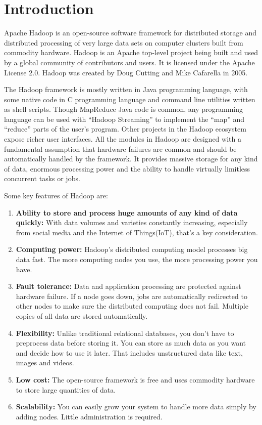 \documentclass[conference]{IEEEtran}
\begin{document}
\section{Introduction}
Apache Hadoop is an open-source software framework for distributed storage
and distributed processing of very large data sets on computer clusters built from commodity
hardware.\cite{Apache} Hadoop is an Apache top-level project being built and used by a global
community of contributors and users. It is licensed under the Apache License 2.0.\cite{Introapache} 
Hadoop was created by Doug Cutting and Mike Cafarella in 2005.
\par The Hadoop framework is mostly written in Java programming language,
with some native code in C programming language and command line utilities
written as shell scripts. Though MapReduce Java code is common, any programming language can
be used with “Hadoop Streaming” to implement the “map” and “reduce” parts of the user’s program.\cite{Hadoopadventures}
Other projects in the Hadoop ecosystem expose richer user interfaces.
All the modules in Hadoop are designed with a fundamental assumption that
hardware failures are common and should be automatically handled by the framework.
It provides massive storage for any kind of data, enormous processing power and the ability to handle virtually
limitless concurrent tasks or jobs.
\par Some key features of Hadoop are:
\begin{enumerate}
        \item \textbf{Ability to store and process huge amounts of any kind of data quickly:}
                With data volumes and varieties constantly increasing, especially from social media and the Internet of Things(IoT), that’s a key consideration.
        \item \textbf{Computing power:} Hadoop’s distributed computing model processes big data fast. The more computing nodes you use, the more processing power you have.
        \item \textbf{Fault tolerance:} Data and application processing are protected against hardware failure. If a node goes down, jobs are automatically redirected to other nodes to make sure the distributed computing does not fail. Multiple copies of all data are stored automatically.
        \item \textbf{Flexibility:} Unlike traditional relational databases, you don’t have to preprocess data before storing it. You can store as much data as you want and decide how to use it later. That includes unstructured data like text, images and videos.
        \item \textbf{Low cost:} The open-source framework is free and uses commodity hardware to store large quantities of data.
        \item \textbf{Scalability:} You can easily grow your system to handle more data simply by adding nodes. Little administration is required.
\end{enumerate}
\end{document}
